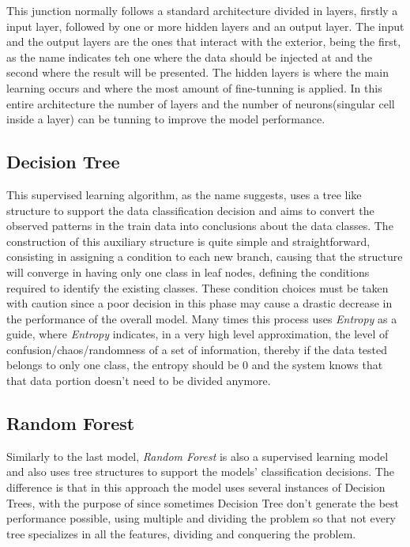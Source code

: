 \documentclass[conference]{IEEEtran}
\begin{document}
This junction normally follows a standard architecture divided in layers, firstly a input layer, followed by one or more hidden layers and an output layer. The input and the output layers are the ones that interact with the exterior, being the first, as the name indicates teh one where the data should be injected at and the second where the result will be presented. The hidden layers is where the main learning occurs and where the most amount of fine-tunning is applied. In this entire architecture the number of layers and the number of neurons(singular cell inside a layer) can be tunning to improve the model performance.

\subsection{Decision Tree}
This supervised learning algorithm, as the name suggests, uses a tree like structure to support the data classification decision and aims to convert the observed patterns in the train data into conclusions about the data classes. The construction of this auxiliary structure is quite simple and straightforward, consisting in assigning a condition to each new branch, causing that the structure will converge in having only one class in leaf nodes, defining the conditions required to identify the existing classes. These condition choices must be taken with caution since a poor decision in this phase may cause a drastic decrease in the performance of the overall model. Many times this process uses \textit{Entropy} as a guide, where \textit{Entropy} indicates, in a very high level approximation, the level of confusion/chaos/randomness of a set of information, thereby if the data tested belongs to only one class, the entropy should be 0 and the system knows that that data portion doesn't need to be divided anymore.

\subsection{Random Forest}
Similarly to the last model, \textit{Random Forest} is also a supervised learning model and also uses tree structures to support the models' classification decisions. The difference is that in this approach the model uses several instances of Decision Trees, with the purpose of since sometimes Decision Tree don't generate the best performance possible, using multiple and dividing the problem so that not every tree specializes in all the features, dividing and conquering the problem.
\end{document}
